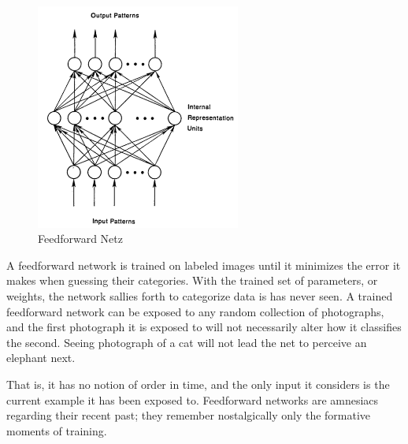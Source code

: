 {\renewcommand{\figurename}{Abb.}
\begin{figure}[htp]
\centering
\includegraphics[width=0.60\textwidth]{pictures/feedforward_rumelhart.png}
\caption[Feedforward Netz]{Feedforward Netz\protect\footnotemark}
\end{figure}

A feedforward network is trained on labeled images until it minimizes the error it makes when guessing their categories. With the trained set of parameters, or weights, the network sallies forth to categorize data is has never seen. A trained feedforward network can be exposed to any random collection of photographs, and the first photograph it is exposed to will not necessarily alter how it classifies the second. Seeing photograph of a cat will not lead the net to perceive an elephant next.

That is, it has no notion of order in time, and the only input it considers is the current example it has been exposed to. Feedforward networks are amnesiacs regarding their recent past; they remember nostalgically only the formative moments of training.


}
